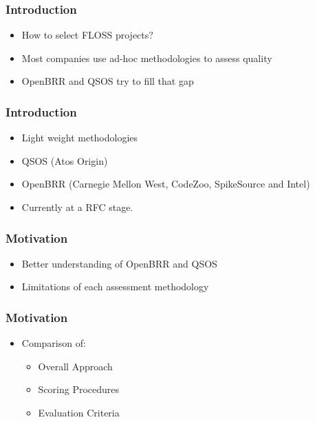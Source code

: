 \documentclass{beamer}
\begin{document}

\begin{frame}
\frametitle{Introduction}
 \begin{itemize}
 \item How to select FLOSS projects?
 \item Most companies use ad-hoc methodologies to assess quality
 \item OpenBRR and QSOS try to fill that gap
 \end{itemize}
\end{frame}


\begin{frame}
\frametitle{Introduction}
 \begin{itemize}
 \item Light weight methodologies
 \item QSOS (Atos Origin)
 \item OpenBRR (Carnegie Mellon West, CodeZoo, SpikeSource and Intel)
 \item Currently at a RFC stage.
 \end{itemize}
\end{frame}


\begin{frame}
\frametitle{Motivation}
 \begin{itemize}
 \item Better understanding of OpenBRR and QSOS
 \item Limitations of each assessment methodology
 \end{itemize}
\end{frame}



\begin{frame}
\frametitle{Motivation}
 \begin{itemize}
 \item Comparison of:
    \begin{itemize}
     \item Overall Approach
     \item Scoring Procedures
     \item Evaluation Criteria
    \end{itemize}
 \end{itemize}
\end{frame}
\end{document}
